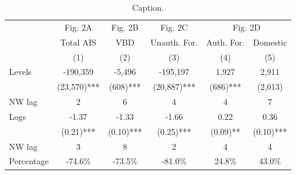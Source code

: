 \begin{table}[h!]
\centering
\caption{Caption.} 
\label{tab:net}
\begin{tabular}{lccccc}
   \toprule & Fig. 2A & Fig. 2B & Fig. 2C & \multicolumn{2}{c}{Fig. 2D} \\ 
                  & Total AIS & VBD & Unauth. For. & Auth. For. & Domestic \\  & (1) & (2) & (3) & (4) & (5) \\ 
    \midrule Levels & -190,359 & -5,496 & -195,197 & 1,927 & 2,911 \\ 
   & (23,570)*** & (608)*** & (20,887)*** & (686)*** & (2,013) \\ 
  NW lag & 2 & 6 & 4 & 4 & 7 \\ 
    \midrule Logs & -1.37 & -1.33 & -1.66 & 0.22 & 0.36 \\ 
   & (0.21)*** & (0.10)*** & (0.25)*** & (0.09)** & (0.10)*** \\ 
  NW lag & 3 & 8 & 2 & 4 & 4 \\ 
    \midrule Percentage & -74.6\% & -73.5\% & -81.0\% & 24.8\% & 43.0\% \\ 
   \bottomrule \end{tabular}
\end{table}
